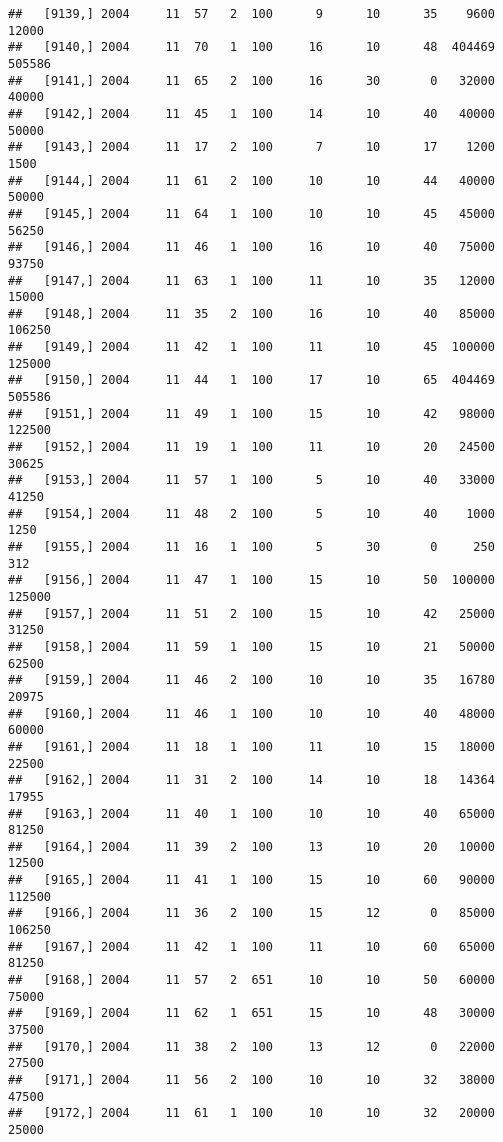 \documentclass{article}\usepackage[]{graphicx}\usepackage[]{color}
\makeatletter
\newenvironment{kframe}{%
 \def\at@end@of@kframe{}%
 \ifinner\ifhmode%
  \def\at@end@of@kframe{\end{minipage}}%
  \begin{minipage}{\columnwidth}%
 \fi\fi%
 \def\FrameCommand##1{\hskip\@totalleftmargin \hskip-\fboxsep
 \colorbox{shadecolor}{##1}\hskip-\fboxsep
     \hskip-\linewidth \hskip-\@totalleftmargin \hskip\columnwidth}%
 \MakeFramed {\advance\hsize-\width
   \@totalleftmargin\z@ \linewidth\hsize
   \@setminipage}}%
 {\par\unskip\endMakeFramed%
 \at@end@of@kframe}
\newenvironment{knitrout}{}{} %
\makeatother
\begin{document}
\begin{knitrout}
\begin{kframe}
\begin{verbatim}
##   [9139,] 2004     11  57   2  100      9      10      35    9600   12000
##   [9140,] 2004     11  70   1  100     16      10      48  404469  505586
##   [9141,] 2004     11  65   2  100     16      30       0   32000   40000
##   [9142,] 2004     11  45   1  100     14      10      40   40000   50000
##   [9143,] 2004     11  17   2  100      7      10      17    1200    1500
##   [9144,] 2004     11  61   2  100     10      10      44   40000   50000
##   [9145,] 2004     11  64   1  100     10      10      45   45000   56250
##   [9146,] 2004     11  46   1  100     16      10      40   75000   93750
##   [9147,] 2004     11  63   1  100     11      10      35   12000   15000
##   [9148,] 2004     11  35   2  100     16      10      40   85000  106250
##   [9149,] 2004     11  42   1  100     11      10      45  100000  125000
##   [9150,] 2004     11  44   1  100     17      10      65  404469  505586
##   [9151,] 2004     11  49   1  100     15      10      42   98000  122500
##   [9152,] 2004     11  19   1  100     11      10      20   24500   30625
##   [9153,] 2004     11  57   1  100      5      10      40   33000   41250
##   [9154,] 2004     11  48   2  100      5      10      40    1000    1250
##   [9155,] 2004     11  16   1  100      5      30       0     250     312
##   [9156,] 2004     11  47   1  100     15      10      50  100000  125000
##   [9157,] 2004     11  51   2  100     15      10      42   25000   31250
##   [9158,] 2004     11  59   1  100     15      10      21   50000   62500
##   [9159,] 2004     11  46   2  100     10      10      35   16780   20975
##   [9160,] 2004     11  46   1  100     10      10      40   48000   60000
##   [9161,] 2004     11  18   1  100     11      10      15   18000   22500
##   [9162,] 2004     11  31   2  100     14      10      18   14364   17955
##   [9163,] 2004     11  40   1  100     10      10      40   65000   81250
##   [9164,] 2004     11  39   2  100     13      10      20   10000   12500
##   [9165,] 2004     11  41   1  100     15      10      60   90000  112500
##   [9166,] 2004     11  36   2  100     15      12       0   85000  106250
##   [9167,] 2004     11  42   1  100     11      10      60   65000   81250
##   [9168,] 2004     11  57   2  651     10      10      50   60000   75000
##   [9169,] 2004     11  62   1  651     15      10      48   30000   37500
##   [9170,] 2004     11  38   2  100     13      12       0   22000   27500
##   [9171,] 2004     11  56   2  100     10      10      32   38000   47500
##   [9172,] 2004     11  61   1  100     10      10      32   20000   25000

\end{verbatim}
\end{kframe}
\end{knitrout}
\end{document}
